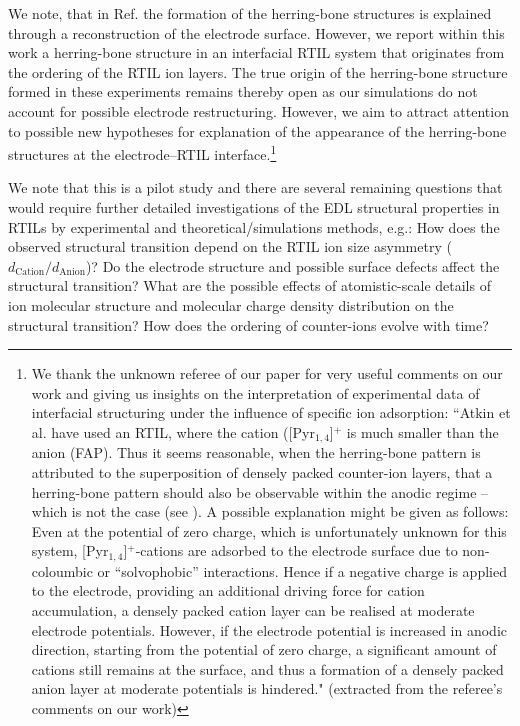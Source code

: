\documentclass[final,5p,times,twocolumn]{elsarticle}
\begin{document}
We note, that in Ref. \cite{Aal2011,Druschler2012} the formation of the herring-bone structures is explained through a reconstruction of the electrode surface. However, we report within this work a herring-bone structure in an interfacial RTIL system that originates from the ordering of the RTIL ion layers. The true origin of the herring-bone structure formed in these experiments remains thereby open as our simulations do not account for possible electrode restructuring. However, we aim to attract attention to possible new hypotheses for explanation of the appearance of the herring-bone structures at the electrode--RTIL interface.\footnote{We thank the unknown referee of our paper for very useful comments on our work and giving us insights on the interpretation of experimental data of interfacial structuring under the influence of specific ion adsorption:
``Atkin et al. \cite{Atkin2009} have used an RTIL, where the cation ([Pyr$_{1,4}$]$^+$ is much smaller than the anion (FAP). Thus it seems reasonable, when the herring-bone pattern is attributed to the superposition of densely packed counter-ion layers, that a herring-bone pattern should also be observable within the anodic regime -- which is not the case (see \cite{Druschler2012}). A possible explanation might be given as follows: Even at the potential of zero charge, which is unfortunately unknown for this system, [Pyr$_{1,4}$]$^+$-cations are adsorbed to the electrode surface due to non-coloumbic or ``solvophobic'' interactions. Hence if a negative charge is applied to the electrode, providing an additional driving force for cation accumulation, a densely packed cation layer can be realised at moderate electrode potentials. However, if the electrode potential is increased in anodic direction, starting from the potential of zero charge, a significant amount of cations still remains at the surface, and thus a formation of a densely packed anion layer at moderate potentials is hindered." (extracted from the referee's comments on our work)}

We note that this is a pilot study and there are several remaining questions that would require further detailed investigations of the EDL structural properties in RTILs by experimental and theoretical/simulations methods, e.g.: How does the observed structural transition depend on the RTIL ion size asymmetry ($d_{\mathrm{Cation}}/d_{\mathrm{Anion}}$)? Do the electrode structure and possible surface defects affect the structural transition? What are the possible effects  of atomistic-scale details of ion molecular structure and molecular charge density distribution on the structural transition? How does the ordering of counter-ions evolve with time?
\end{document}
